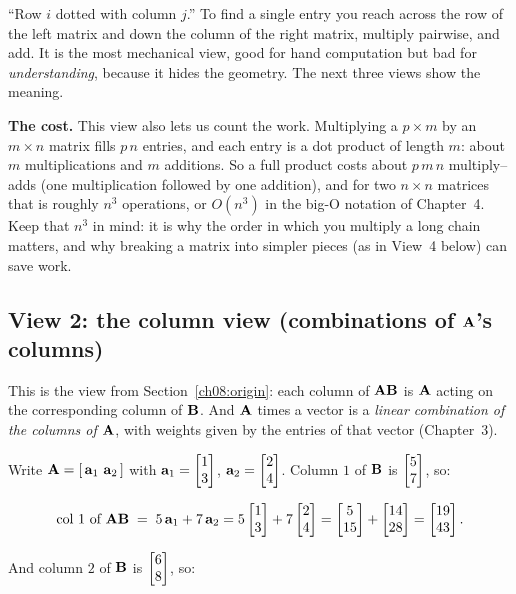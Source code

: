 \begin{intuitionbox}
``Row $i$ dotted with column $j$.'' To find a single entry you reach across the row of
the left matrix and down the column of the right matrix, multiply pairwise, and add.
It is the most mechanical view, good for hand computation but bad for
\emph{understanding}, because it hides the geometry. The next three views show the meaning.
\end{intuitionbox}

\begin{marginnotebox}
\textbf{The cost.} This view also lets us count the work. Multiplying a $p\times m$ by an
$m\times n$ matrix fills $p\,n$ entries, and each entry is a dot product of length $m$:
about $m$ multiplications and $m$ additions. So a full product costs about
$p\,m\,n$ multiply--adds (one multiplication followed by one addition), and for two
$n\times n$ matrices that is roughly $n^3$ operations, or $O(n^3)$ in the big-O notation
of Chapter~4. Keep that $n^3$ in mind: it is why the order in which you multiply a
long chain matters, and why breaking a matrix into simpler pieces (as in View~4 below)
can save work.
\end{marginnotebox}

\subsection{View 2: the column view (combinations of $\mathbf{A}$'s columns)}

This is the view from Section~\ref{ch08:origin}: each column of $\mathbf{A}\mathbf{B}$ is
$\mathbf{A}$ acting on the corresponding column of $\mathbf{B}$. And $\mathbf{A}$
times a vector is a \emph{linear combination of the columns of $\mathbf{A}$},
with weights given by the entries of that vector (Chapter~3).

Write $\mat{A} = [\,\vec{a}_1 \ \vec{a}_2\,]$ with $\mathbf{a}_1 = \begin{bmatrix}1\\3\end{bmatrix}$,
$\mathbf{a}_2 = \begin{bmatrix}2\\4\end{bmatrix}$. Column $1$ of $\mathbf{B}$ is $\begin{bmatrix}5\\7\end{bmatrix}$, so:

\[
\text{col 1 of } \mathbf{A}\mathbf{B} \;=\; 5\,\mathbf{a}_1 + 7\,\mathbf{a}_2
= 5\begin{bmatrix}1\\3\end{bmatrix} + 7\begin{bmatrix}2\\4\end{bmatrix}
= \begin{bmatrix}5\\15\end{bmatrix} + \begin{bmatrix}14\\28\end{bmatrix} = \begin{bmatrix}19\\43\end{bmatrix}.
\]

And column $2$ of $\mathbf{B}$ is $\begin{bmatrix}6\\8\end{bmatrix}$, so:

